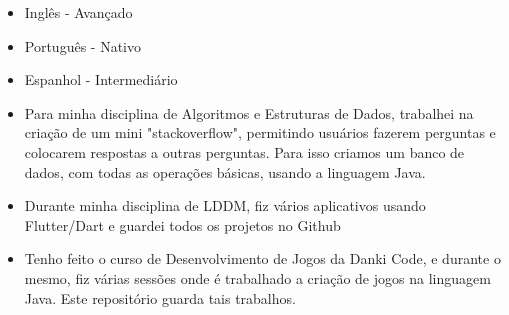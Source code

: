 \begin{itemize}
    \item Inglês    - Avançado
    \item Português - Nativo 
    \item Espanhol  - Intermediário
\end{itemize}







\begin{itemize}
\item Para minha disciplina de Algoritmos e Estruturas de Dados, trabalhei na criação de um mini "stackoverflow", permitindo usuários fazerem perguntas e colocarem respostas a outras perguntas. Para isso criamos um banco de dados, com todas as operações básicas, usando a linguagem Java. 
\end{itemize}
\smallskip
{}
\begin{itemize}
\item Durante minha disciplina de LDDM, fiz vários aplicativos usando Flutter/Dart e guardei todos os projetos no Github
\end{itemize}
\smallskip
{}
\begin{itemize}
\item Tenho feito o curso de Desenvolvimento de Jogos da Danki Code, e durante o mesmo, fiz várias sessões onde é trabalhado a criação de jogos na linguagem Java. Este repositório guarda tais trabalhos. 
\end{itemize}
\smallskip

